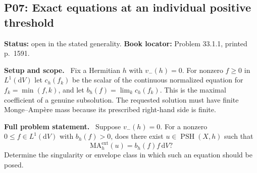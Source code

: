 \documentclass[11pt]{article}
\newcommand{\PSH}{\operatorname{PSH}}
\newcommand{\field}[1]{\par\medskip\noindent\textbf{#1.}\ }
\begin{document}
\subsection{P07: Exact equations at an individual positive threshold}
\label{P07}
\noindent\textbf{Status:} open in the stated generality. \textbf{Book locator:} Problem 33.1.1, printed p.~1591.
\field{Setup and scope} Fix a Hermitian $h$ with $v_-(h)=0$. For nonzero $f\geq0$ in $L^1(\mathrm dV)$ let $c_h(f_k)$ be the scalar of the continuous normalized equation for $f_k=\min(f,k)$, and let $b_h(f)=\lim_kc_h(f_k)$. This is the maximal coefficient of a genuine subsolution. The requested solution must have finite Monge--Amp\`ere mass because its prescribed right-hand side is finite.
\field{Full problem statement} Suppose $v_-(h)=0$. For a nonzero $0\leq f\in L^1(\mathrm{d}V)$ with $b_h(f)>0$, does there exist $u\in\PSH(X,h)$ such that
\[
 \mathrm{MA}^{\mathrm{ext}}_h(u)=b_h(f)f\,\mathrm{d}V?
\]
Determine the singularity or envelope class in which such an equation should be posed.
\end{document}
